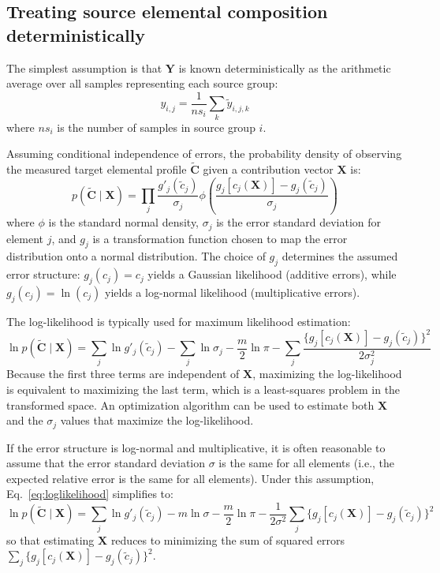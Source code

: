 \subsection{Treating source elemental composition deterministically}
The simplest assumption is that $\mathbf{Y}$ is known deterministically as the arithmetic average over all samples representing each source group:
\begin{equation}\label{eq:y_avg}
    y_{i,j} = \frac{1}{ns_i} \sum_k \tilde{y}_{i,j,k}
\end{equation}
where $ns_i$ is the number of samples in source group $i$.

Assuming conditional independence of errors, the probability density of observing the measured target elemental profile $\tilde{\mathbf{C}}$ given a contribution vector $\mathbf{X}$ is:
\begin{equation}\label{eq:likelihood_C_given_X}
    p(\tilde{\mathbf{C}} \mid \mathbf{X}) = \prod_j \frac{g'_j(\tilde{c}_j)}{\sigma_j} \phi\!\left(\frac{g_j[c_j(\mathbf{X})] - g_j(\tilde{c}_j)}{\sigma_j}\right)
\end{equation}
where $\phi$ is the standard normal density, $\sigma_j$ is the error standard deviation for element $j$, and $g_j$ is a transformation function chosen to map the error distribution onto a normal distribution. The choice of $g_j$ determines the assumed error structure: $g_j(c_j) = c_j$ yields a Gaussian likelihood (additive errors), while $g_j(c_j) = \ln(c_j)$ yields a log-normal likelihood (multiplicative errors).

The log-likelihood is typically used for maximum likelihood estimation:
\begin{equation}\label{eq:loglikelihood}
    \ln p(\tilde{\mathbf{C}} \mid \mathbf{X}) = \sum_j \ln g'_j(\tilde{c}_j) - \sum_j \ln \sigma_j - \frac{m}{2}\ln \pi - \sum_j \frac{\{g_j[c_j(\mathbf{X})] - g_j(\tilde{c}_j)\}^2}{2\sigma_j^2}
\end{equation}
Because the first three terms are independent of $\mathbf{X}$, maximizing the log-likelihood is equivalent to maximizing the last term, which is a least-squares problem in the transformed space. An optimization algorithm can be used to estimate both $\mathbf{X}$ and the $\sigma_j$ values that maximize the log-likelihood.

If the error structure is log-normal and multiplicative, it is often reasonable to assume that the error standard deviation $\sigma$ is the same for all elements (i.e., the expected relative error is the same for all elements). Under this assumption, Eq.~\eqref{eq:loglikelihood} simplifies to:
\begin{equation}\label{eq:loglikelihood-eqstd}
    \ln p(\tilde{\mathbf{C}} \mid \mathbf{X}) = \sum_j \ln g'_j(\tilde{c}_j) - m \ln \sigma - \frac{m}{2}\ln \pi - \frac{1}{2\sigma^2} \sum_j \{g_j[c_j(\mathbf{X})] - g_j(\tilde{c}_j)\}^2
\end{equation}
so that estimating $\mathbf{X}$ reduces to minimizing the sum of squared errors $\sum_j \{g_j[c_j(\mathbf{X})] - g_j(\tilde{c}_j)\}^2$.


